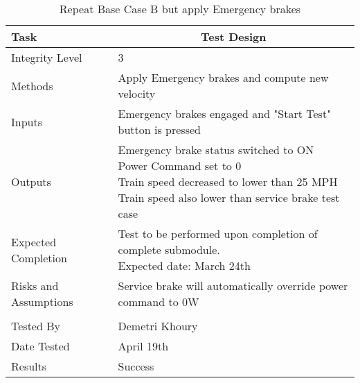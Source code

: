 \documentclass[]{article}
\begin{document}
	\begin{table}[H]
		\centering
		\caption{Repeat Base Case B but apply Emergency brakes}
		\begin{tabular}{|l|l|}
			\hline
			Task & \multicolumn{1}{c|}{Test Design} \\ \hline
			Integrity Level & 3 \\ \hline
			Methods & Apply Emergency brakes and compute new velocity  \\ \hline
			Inputs &  Emergency brakes engaged and "Start Test" button is pressed \\ \hline
			Outputs & \parbox[t]{10cm}{ Emergency brake status switched to ON\\ Power Command set to 0\\ Train speed decreased to lower than 25 MPH\\ Train speed also lower than service brake test case  }\\ \hline
			Expected Completion & \parbox[t]{10cm}{Test to be performed upon completion of complete submodule.\\ Expected date: March 24th}\\ \hline
			Risks and Assumptions & Service brake will automatically override power command to 0W\\ \hline
			\\ \hline
			Tested By   &  Demetri Khoury\\	\hline
			Date Tested & \parbox[t]{10cm}{April 19th}\\ \hline
			Results & Success\\ \hline
		\end{tabular}
	\end{table}
\end{document}
